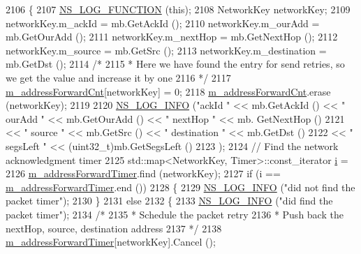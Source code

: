 \begin{DoxyCode}
2106 \{
2107   \hyperlink{log-macros-disabled_8h_a90b90d5bad1f39cb1b64923ea94c0761}{NS\_LOG\_FUNCTION} (\textcolor{keyword}{this});
2108   NetworkKey networkKey;
2109   networkKey.m\_ackId = mb.GetAckId ();
2110   networkKey.m\_ourAdd = mb.GetOurAdd ();
2111   networkKey.m\_nextHop = mb.GetNextHop ();
2112   networkKey.m\_source = mb.GetSrc ();
2113   networkKey.m\_destination = mb.GetDst ();
2114   \textcolor{comment}{/*}
2115 \textcolor{comment}{   * Here we have found the entry for send retries, so we get the value and increase it by one}
2116 \textcolor{comment}{   */}
2117   \hyperlink{classns3_1_1dsr_1_1DsrRouting_a5042f7e5df0470025fdb6023fcc24411}{m\_addressForwardCnt}[networkKey] = 0;
2118   \hyperlink{classns3_1_1dsr_1_1DsrRouting_a5042f7e5df0470025fdb6023fcc24411}{m\_addressForwardCnt}.erase (networkKey);
2119 
2120   \hyperlink{group__logging_gafbd73ee2cf9f26b319f49086d8e860fb}{NS\_LOG\_INFO} (\textcolor{stringliteral}{"ackId "} << mb.GetAckId () << \textcolor{stringliteral}{" ourAdd "} << mb.GetOurAdd () << \textcolor{stringliteral}{" nextHop "} << mb.
      GetNextHop ()
2121                         << \textcolor{stringliteral}{" source "} << mb.GetSrc () << \textcolor{stringliteral}{" destination "} << mb.GetDst ()
2122                         << \textcolor{stringliteral}{" segsLeft "} << (uint32\_t)mb.GetSegsLeft ()
2123                );
2124   \textcolor{comment}{// Find the network acknowledgment timer}
2125   std::map<NetworkKey, Timer>::const\_iterator \hyperlink{bernuolliDistribution_8m_a6f6ccfcf58b31cb6412107d9d5281426}{i} =
2126     \hyperlink{classns3_1_1dsr_1_1DsrRouting_a4a35b13cdca413ab5bc0b1b3b7b78907}{m\_addressForwardTimer}.find (networkKey);
2127   \textcolor{keywordflow}{if} (i == \hyperlink{classns3_1_1dsr_1_1DsrRouting_a4a35b13cdca413ab5bc0b1b3b7b78907}{m\_addressForwardTimer}.end ())
2128     \{
2129       \hyperlink{group__logging_gafbd73ee2cf9f26b319f49086d8e860fb}{NS\_LOG\_INFO} (\textcolor{stringliteral}{"did not find the packet timer"});
2130     \}
2131   \textcolor{keywordflow}{else}
2132     \{
2133       \hyperlink{group__logging_gafbd73ee2cf9f26b319f49086d8e860fb}{NS\_LOG\_INFO} (\textcolor{stringliteral}{"did find the packet timer"});
2134       \textcolor{comment}{/*}
2135 \textcolor{comment}{       * Schedule the packet retry}
2136 \textcolor{comment}{       * Push back the nextHop, source, destination address}
2137 \textcolor{comment}{       */}
2138       \hyperlink{classns3_1_1dsr_1_1DsrRouting_a4a35b13cdca413ab5bc0b1b3b7b78907}{m\_addressForwardTimer}[networkKey].Cancel ();

\end{DoxyCode}
